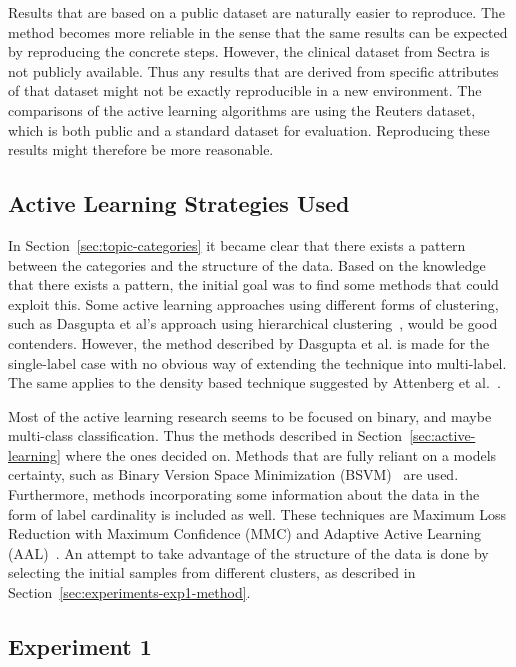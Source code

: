 Results that are based on a public dataset are naturally easier to reproduce.
The method becomes more reliable in the sense that the same results can be expected by reproducing the concrete steps.
However, the clinical dataset from Sectra is not publicly available.
Thus any results that are derived from specific attributes of that dataset might not be exactly reproducible in a new environment.
The comparisons of the active learning algorithms are using the Reuters dataset, which is both public and a standard dataset for evaluation.
Reproducing these results might therefore be more reasonable.

\subsection{Active Learning Strategies Used}

In Section~\ref{sec:topic-categories} it became clear that there exists a pattern between the categories and the structure of the data.
Based on the knowledge that there exists a pattern, the initial goal was to find some methods that could exploit this.
Some active learning approaches using different forms of clustering, such as Dasgupta et al\@'s approach using hierarchical clustering~\cite{dasgupta2008hierarchical}, would be good contenders.
However, the method described by Dasgupta et al\@. is made for the single-label case with no obvious way of extending the technique into multi-label.
The same applies to the density based technique suggested by Attenberg et al\@.~\cite{attenberg2013class}.

Most of the active learning research seems to be focused on binary, and maybe multi-class classification.
Thus the methods described in Section~\ref{sec:active-learning} where the ones decided on.
Methods that are fully reliant on a models certainty, such as Binary Version Space Minimization (BSVM)~\cite{brinker2006active} are used.
Furthermore, methods incorporating some information about the data in the form of label cardinality is included as well.
These techniques are Maximum Loss Reduction with Maximum Confidence (MMC) and Adaptive Active Learning (AAL)~\cite{yang2009effective, li2013active}.
An attempt to take advantage of the structure of the data is done by selecting the initial samples from different clusters, as described in Section~\ref{sec:experiments-exp1-method}.

\subsection{Experiment 1}

